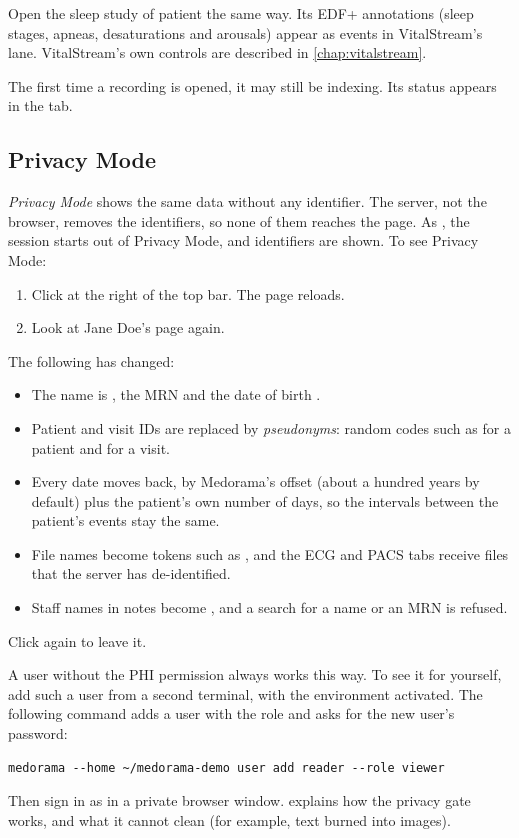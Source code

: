 Open the sleep study of patient  the same way. Its EDF+ annotations (sleep stages,
apneas, desaturations and arousals) appear as events in VitalStream's  lane.
VitalStream's own controls are described in \cref{chap:vitalstream}.

The first time a recording is opened, it may still be indexing. Its status appears in the
 tab.

\subsection{Privacy Mode}
\label{sec:quickstart-privacy}

\emph{Privacy Mode} shows the same data without any identifier. The server, not the browser,
removes the identifiers, so none of them reaches the page. As , the session starts
out of Privacy Mode, and identifiers are shown. To see Privacy Mode:
\begin{enumerate}
\item Click  at the right of the top bar. The page reloads.
\item Look at Jane Doe's page again.
\end{enumerate}
The following has changed:
\begin{itemize}
\item The name is , the MRN \code{[MRN]} and the date of birth
  .
\item Patient and visit IDs are replaced by \emph{pseudonyms}: random codes such as
   for a patient and  for a visit.
\item Every date moves back, by Medorama's offset (about a hundred years by default) plus the
  patient's own number of days, so the intervals between the patient's events stay the same.
\item File names become tokens such as , and the ECG and PACS tabs receive
  files that the server has de-identified.
\item Staff names in notes become , and a search for a name or an MRN is
  refused.
\end{itemize}
Click  again to leave it.


A user without the PHI permission always works this way. To see it for yourself, add such a user
from a second terminal, with the environment activated. The following command adds a user with
the role  and asks for the new user's password:
\begin{lstlisting}[style=shell]
medorama --home ~/medorama-demo user add reader --role viewer
\end{lstlisting}
Then sign in as  in a private browser window.  explains how
the privacy gate works, and what it cannot clean (for example, text burned into images).

